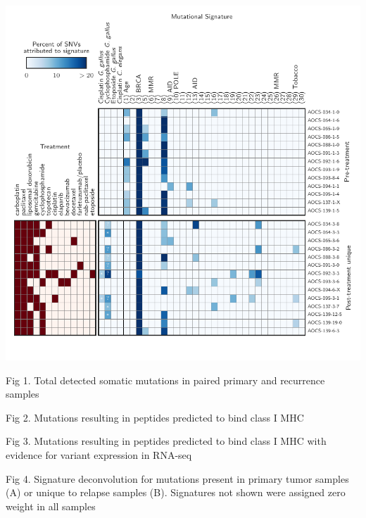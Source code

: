 \includegraphics{figures/signatures.pdf}


Fig 1. Total detected somatic mutations in paired primary and recurrence samples

Fig 2. Mutations resulting in peptides predicted to bind class I MHC

Fig 3. Mutations resulting in peptides predicted to bind class I MHC with evidence for variant expression in RNA-seq

Fig 4. Signature deconvolution for mutations present in primary tumor samples (A) or unique to relapse samples (B). Signatures not shown were assigned zero weight in all samples